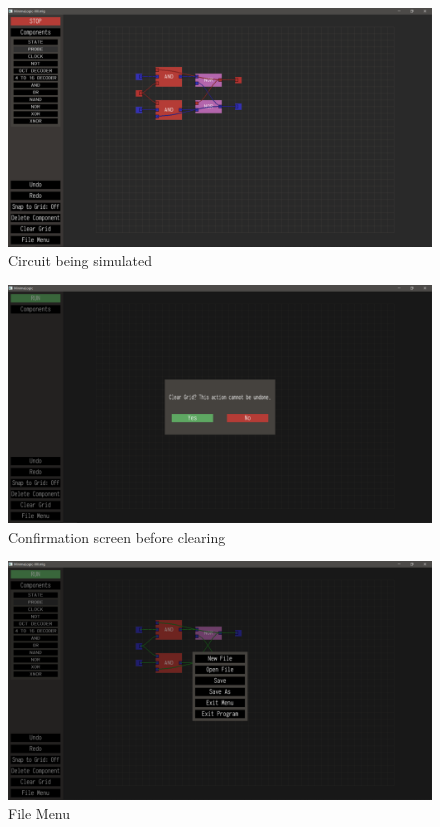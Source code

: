 \documentclass[report]{subfiles}
\begin{document}
\begin{figure}[H]
    \centering
    \includegraphics[width=\textwidth]{graphics/jkff_simulating.png}
    \caption{Circuit being simulated}
\end{figure}
\begin{figure}[H]
    \centering
    \includegraphics[width=\textwidth]{graphics/confirm_clear.png}
    \caption{Confirmation screen before clearing}
\end{figure}
\begin{figure}[H]
    \centering
    \includegraphics[width=\textwidth]{graphics/file_menu.png}
    \caption{File Menu}
\end{figure}
\end{document}
